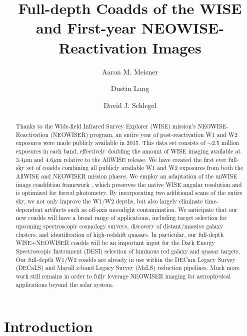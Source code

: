 \documentclass{emulateapj}
\begin{document}
 
\title{Full-depth Coadds of the WISE and First-year NEOWISE-Reactivation Images}

\author{Aaron M. Meisner}
\author{Dustin Lang}
\author{David J. Schlegel}


\begin{abstract} 
Thanks to the Wide-field Infrared Survey Explorer (WISE) mission's
NEOWISE-Reactivation (NEOWISER) program, an entire year of post-reactivation W1
and W2 exposures were made publicly available in 2015. This data set consists of
$\sim$2.5 million exposures in each band, effectively doubling the amount
of WISE imaging available at 3.4$\mu$m and 4.6$\mu$m relative to the AllWISE
release. We have created the first ever full-sky set of coadds combining all 
publicly available W1 and W2 exposures from both the AllWISE and 
NEOWISER mission phases. We employ an adaptation of the unWISE image coaddition
framework \citep{lang14}, which preserves the native WISE angular resolution 
and is optimized for forced photometry. By incorporating two additional scans
of the entire sky, we not only improve the W1/W2 depths, but also largely
eliminate time-dependent artifacts such as off-axis moonlight contamination.
We anticipate that our new coadds will have a broad range of 
applications, including target selection for upcoming spectroscopic cosmology 
surveys, discovery of distant/massive galaxy clusters, and 
identification of high-redshift quasars. In particular, our full-depth 
WISE+NEOWISER coadds will be an important input for the Dark Energy 
Spectroscopic Instrument (DESI) selection of luminous red galaxy and quasar 
targets. Our full-depth W1/W2 coadds are already in use within the 
DECam Legacy Survey (DECaLS) and Mayall z-band Legacy Survey (MzLS) reduction 
pipelines. Much more work still remains in order to fully leverage NEOWISER 
imaging for astrophysical applications beyond the solar system.
\end{abstract}  
 

\section{Introduction}
\end{document}

